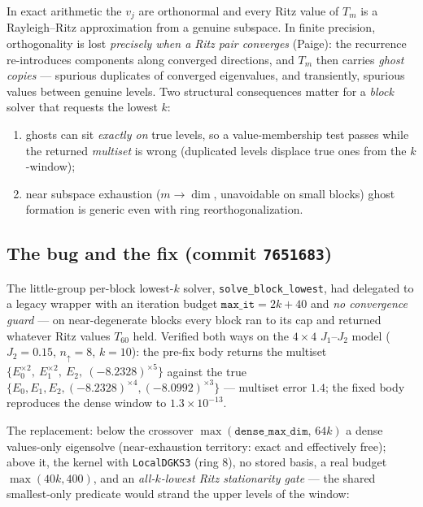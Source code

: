 \documentclass[11pt]{article}
\begin{document}
In exact arithmetic the $v_j$ are orthonormal and every Ritz value of $T_m$
is a Rayleigh--Ritz approximation from a genuine subspace. In finite
precision, orthogonality is lost \emph{precisely when a Ritz pair
converges} (Paige): the recurrence re-introduces components along converged
directions, and $T_m$ then carries \emph{ghost copies} --- spurious
duplicates of converged eigenvalues, and transiently, spurious values
between genuine levels. Two structural consequences matter for a
\emph{block} solver that requests the lowest $k$:
\begin{enumerate}
\item ghosts can sit \emph{exactly on} true levels, so a value-membership
  test passes while the returned \emph{multiset} is wrong (duplicated
  levels displace true ones from the $k$-window);
\item near subspace exhaustion ($m \to \dim$, unavoidable on small blocks)
  ghost formation is generic even with ring reorthogonalization.
\end{enumerate}

\subsection{The bug and the fix (commit \texttt{7651683})}

The little-group per-block lowest-$k$ solver, \texttt{solve\_block\_lowest},
had delegated to a legacy wrapper with an iteration budget
$\texttt{max\_it} = 2k + 40$ and \emph{no convergence guard} --- on
near-degenerate blocks every block ran to its cap and returned whatever
Ritz values $T_{60}$ held. Verified both ways on the $4\times4$
$J_1$--$J_2$ model ($J_2 = 0.15$, $n_\uparrow = 8$, $k = 10$): the pre-fix
body returns the multiset $\{E_0^{\times 2},\ E_1^{\times 2},\ E_2,\
(-8.2328)^{\times 5}\}$ against the true
$\{E_0, E_1, E_2, (-8.2328)^{\times 4}, (-8.0992)^{\times 3}\}$ ---
multiset error $1.4$; the fixed body reproduces the dense window to
$1.3\times 10^{-13}$.

The replacement: below the crossover $\max(\texttt{dense\_max\_dim},\,64k)$
a dense values-only eigensolve (near-exhaustion territory: exact and
effectively free); above it, the kernel with \texttt{LocalDGKS3} (ring 8),
no stored basis, a real budget $\max(40k, 400)$, and an
\emph{all-$k$-lowest Ritz stationarity gate} --- the shared smallest-only
predicate would strand the upper levels of the window:
\end{document}
